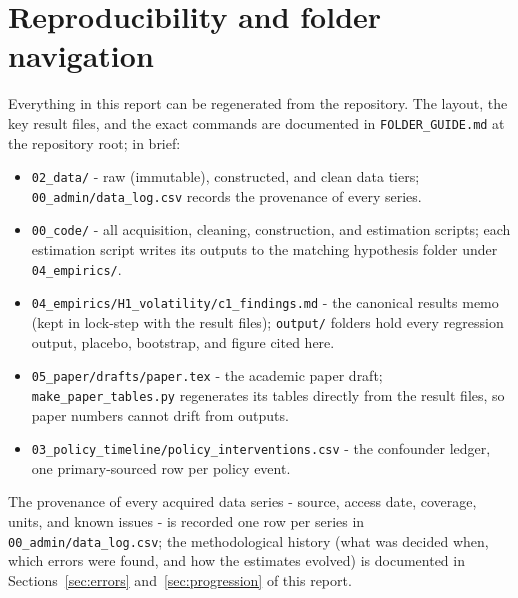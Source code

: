 \documentclass[11pt]{article}
\begin{document}
\section{Reproducibility and folder navigation}
\label{sec:repro}

Everything in this report can be regenerated from the repository. The layout, the key
result files, and the exact commands are documented in \texttt{FOLDER\_GUIDE.md} at the
repository root; in brief:

\begin{itemize}[leftmargin=1.6em,itemsep=1pt]
  \item \texttt{02\_data/} - raw (immutable), constructed, and clean data tiers;
        \texttt{00\_admin/data\_log.csv} records the provenance of every series.
  \item \texttt{00\_code/} - all acquisition, cleaning, construction, and estimation
        scripts; each estimation script writes its outputs to the matching hypothesis
        folder under \texttt{04\_empirics/}.
  \item \texttt{04\_empirics/H1\_volatility/c1\_findings.md} - the canonical results
        memo (kept in lock-step with the result files); \texttt{output/} folders hold
        every regression output, placebo, bootstrap, and figure cited here.
  \item \texttt{05\_paper/drafts/paper.tex} - the academic paper draft;
        \texttt{make\_paper\_tables.py} regenerates its tables directly from the result
        files, so paper numbers cannot drift from outputs.
  \item \texttt{03\_policy\_timeline/policy\_interventions.csv} - the confounder
        ledger, one primary-sourced row per policy event.
\end{itemize}

The provenance of every acquired data series - source, access date, coverage, units,
and known issues - is recorded one row per series in \texttt{00\_admin/data\_log.csv};
the methodological history (what was decided when, which errors were found, and how the
estimates evolved) is documented in Sections~\ref{sec:errors} and~\ref{sec:progression}
of this report.
\end{document}
